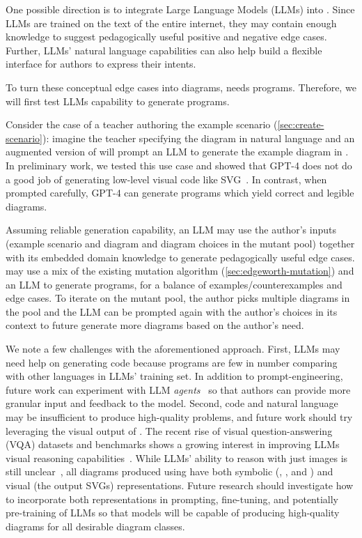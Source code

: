 One possible direction is to integrate Large Language Models (LLMs) into \Edgeworth. Since LLMs are trained on the text of the entire internet, they may contain enough knowledge to suggest pedagogically useful positive and negative edge cases. Further, LLMs' natural language capabilities can also help build a flexible interface for authors to express their intents.

To turn these conceptual edge cases into diagrams, \Penrose{} needs \Substance programs. Therefore, we will first test LLMs capability to generate  \Substance programs.

Consider the case of a teacher authoring the example scenario (\cref{sec:create-scenario}): imagine the teacher specifying the diagram in natural language and an augmented version of \Edgeworth will prompt an LLM to generate the example diagram in \Substance. In preliminary work, we tested this use case and showed that GPT-4 does not do a good job of generating low-level visual code like SVG~\cite{penrosellm}. In contrast, when prompted carefully, GPT-4 can generate \Substance programs which yield correct and legible diagrams.

Assuming reliable \Substance generation capability, an LLM may use the author's inputs (\ie example scenario \Substance and diagram and diagram choices in the mutant pool) together with its embedded domain knowledge to generate pedagogically useful edge cases. \Edgeworth may use a mix of the existing mutation algorithm (\cref{sec:edgeworth-mutation}) and an LLM to generate \Substance programs, for a balance of examples/counterexamples and edge cases. To iterate on the mutant pool, the author picks multiple diagrams in the pool and the LLM can be prompted again with the author's choices in its context to future generate more diagrams based on the author's need.

We note a few challenges with the aforementioned approach. First, LLMs may need help on generating \Substance code because \Substance programs are few in number comparing with other languages in LLMs' training set. In addition to prompt-engineering, future work can experiment with LLM \textit{agents}~\cite{wu_agentkit_2024} so that authors can provide more granular input and feedback to the model. Second, code and natural language may be insufficient to produce high-quality problems, and future work should try leveraging the visual output of \Edgeworth. The recent rise of visual question-answering (VQA) datasets and benchmarks shows a growing interest in improving LLMs visual reasoning capabilities~\cite{lu_mathvista_2024,belouadi_automatikz_2024,fatemi_talk_2023,masry_chartqa_2022}.  While LLMs' ability to reason with just images is still unclear~\cite{rahmanzadehgervi_vision_2024}, all diagrams produced using \Edgeworth have both symbolic (\ie \Substance, \Style, and \Domain) and visual (\ie the output SVGs) representations. Future research should investigate how to incorporate both representations in prompting, fine-tuning, and potentially pre-training of LLMs so that models will be capable of producing high-quality diagrams for all desirable diagram classes.

